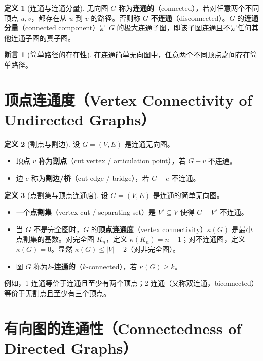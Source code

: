 \documentclass[UTF8,11pt,a4paper]{ctexbook}   %
\theoremstyle{definition}
\newtheorem{definition}{定义}[section]
\newtheorem{proposition}{断言}[section]
\begin{document}
\begin{definition}[连通与连通分量]
无向图 $G$ 称为\textbf{连通的}（connected），若对任意两个不同顶点 $u,v$，都存在从 $u$ 到 $v$ 的路径。否则称 $G$ \textbf{不连通}（disconnected）。$G$ 的\textbf{连通分量}（connected component）是 $G$ 的极大连通子图，即该子图连通且不是任何其他连通子图的真子图。
\end{definition}

\begin{proposition}[简单路径的存在性]
在连通简单无向图中，任意两个不同顶点之间存在简单路径。
\end{proposition}

\section{顶点连通度（Vertex Connectivity of Undirected Graphs）}

\begin{definition}[割点与割边]
设 $G=(V,E)$ 是连通无向图。
\begin{itemize}
    \item 顶点 $v$ 称为\textbf{割点}（cut vertex / articulation point），若 $G-v$ 不连通。
    \item 边 $e$ 称为\textbf{割边/桥}（cut edge / bridge），若 $G-e$ 不连通。
\end{itemize}
\end{definition}

\begin{definition}[点割集与顶点连通度]
设 $G=(V,E)$ 是连通的简单无向图。
\begin{itemize}
    \item 一个\textbf{点割集}（vertex cut / separating set）是 $V' \subseteq V$ 使得 $G-V'$ 不连通。
    \item 当 $G$ 不是完全图时，$G$ 的\textbf{顶点连通度}（vertex connectivity）$\kappa(G)$ 是最小点割集的基数。对完全图 $K_n$，定义 $\kappa(K_n)=n-1$；对不连通图，定义 $\kappa(G)=0$。显然 $\kappa(G) \leq |V|-2$（对非完全图）。
    \item 图 $G$ 称为\textbf{$k$-连通的}（$k$-connected），若 $\kappa(G) \geq k$。
\end{itemize}
\end{definition}

例如，1-连通等价于连通且至少有两个顶点；2-连通（又称双连通，biconnected）等价于无割点且至少有三个顶点。

\section{有向图的连通性（Connectedness of Directed Graphs）}
\end{document}
